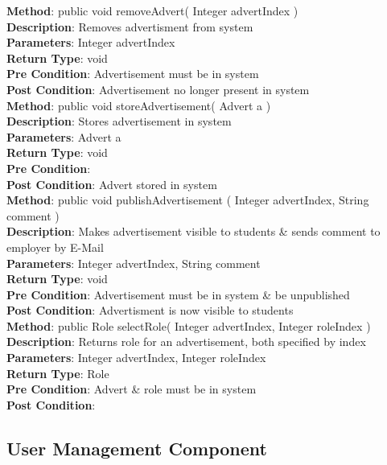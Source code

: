 \documentclass{l3deliverable}
\begin{document}
\textbf{Method}: public void removeAdvert( Integer advertIndex )\\
\textbf{Description}: Removes advertisment from system\\
\textbf{Parameters}: Integer advertIndex \\
\textbf{Return Type}: void \\
\textbf{Pre Condition}: Advertisement must be in system \\
\textbf{Post Condition}: Advertisement no longer present in system\\

\textbf{Method}: public void storeAdvertisement( Advert a )\\
\textbf{Description}: Stores advertisement in system\\
\textbf{Parameters}: Advert a\\
\textbf{Return Type}: void\\
\textbf{Pre Condition}:\\
\textbf{Post Condition}: Advert stored in system\\

\textbf{Method}: public void publishAdvertisement ( Integer advertIndex, String comment )\\
\textbf{Description}: Makes advertisement visible to students \& sends comment to employer by E-Mail\\
\textbf{Parameters}: Integer advertIndex, String comment\\
\textbf{Return Type}: void\\
\textbf{Pre Condition}: Advertisement must be in system \& be unpublished\\
\textbf{Post Condition}: Advertisment is now visible to students\\

\textbf{Method}: public Role selectRole( Integer advertIndex, Integer roleIndex )\\
\textbf{Description}: Returns role for an advertisement, both specified by index\\
\textbf{Parameters}: Integer advertIndex, Integer roleIndex\\
\textbf{Return Type}: Role\\
\textbf{Pre Condition}: Advert \& role must be in system\\
\textbf{Post Condition}:\\

\subsection{User Management Component}
\end{document}
